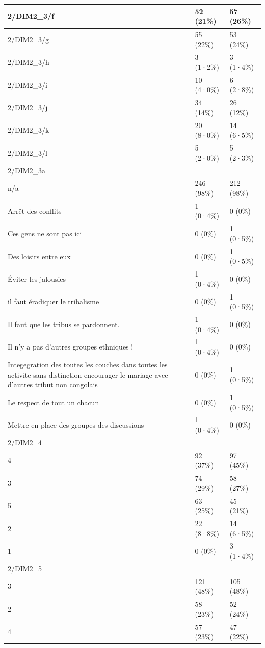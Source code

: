 \documentclass[
]{book}
\begin{document}
\begin{tabular}{l|l|l}
\hline
2/DIM2\_3/f & 52 (21\%) & 57 (26\%)\\
\hline
2/DIM2\_3/g & 55 (22\%) & 53 (24\%)\\
\hline
2/DIM2\_3/h & 3 (1·2\%) & 3 (1·4\%)\\
\hline
2/DIM2\_3/i & 10 (4·0\%) & 6 (2·8\%)\\
\hline
2/DIM2\_3/j & 34 (14\%) & 26 (12\%)\\
\hline
2/DIM2\_3/k & 20 (8·0\%) & 14 (6·5\%)\\
\hline
2/DIM2\_3/l & 5 (2·0\%) & 5 (2·3\%)\\
\hline
2/DIM2\_3a &  & \\
\hline
n/a & 246 (98\%) & 212 (98\%)\\
\hline
Arrêt des conflits & 1 (0·4\%) & 0 (0\%)\\
\hline
Ces gens ne sont pas ici & 0 (0\%) & 1 (0·5\%)\\
\hline
Des loisirs entre eux & 0 (0\%) & 1 (0·5\%)\\
\hline
Éviter les jalousies & 1 (0·4\%) & 0 (0\%)\\
\hline
il faut éradiquer le tribalisme & 0 (0\%) & 1 (0·5\%)\\
\hline
Il faut que les tribus se pardonnent. & 1 (0·4\%) & 0 (0\%)\\
\hline
Il n'y a pas d'autres groupes ethniques ! & 1 (0·4\%) & 0 (0\%)\\
\hline
Integegration des toutes les couches dans toutes les activite sans distinction encourager le mariage avec d'autres tribut non congolais & 0 (0\%) & 1 (0·5\%)\\
\hline
Le respect de tout un  chacun & 0 (0\%) & 1 (0·5\%)\\
\hline
Mettre en place des groupes des discussions & 1 (0·4\%) & 0 (0\%)\\
\hline
2/DIM2\_4 &  & \\
\hline
4 & 92 (37\%) & 97 (45\%)\\
\hline
3 & 74 (29\%) & 58 (27\%)\\
\hline
5 & 63 (25\%) & 45 (21\%)\\
\hline
2 & 22 (8·8\%) & 14 (6·5\%)\\
\hline
1 & 0 (0\%) & 3 (1·4\%)\\
\hline
2/DIM2\_5 &  & \\
\hline
3 & 121 (48\%) & 105 (48\%)\\
\hline
2 & 58 (23\%) & 52 (24\%)\\
\hline
4 & 57 (23\%) & 47 (22\%)\\
\hline

\end{tabular}
\end{document}
